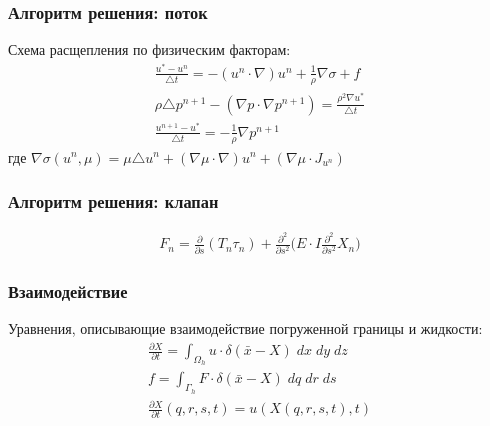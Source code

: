 \documentclass[14pt]{beamer}
\begin{document}
\begin{frame}
\frametitle{Алгоритм решения: поток}
Схема расщепления по физическим факторам:
\begin{gather}
    \label{eq:split_first}
    \frac{u^* - u^n}{\triangle t} = - (u^n \cdot \nabla) u^n + \frac{1}{\rho} \nabla \sigma + f\\
    \label{eq:split_second}
    \rho \triangle p^{n+1} - (\nabla p \cdot \nabla p^{n+1}) = \frac{\rho^2 \nabla u^*}{\triangle t}\\
    \label{eq:split_third}
    \frac{u^{n+1} - u^*}{\triangle t} = - \frac{1}{\rho} \nabla p^{n+1}
\end{gather}
где $\nabla \sigma (u^n, \mu) = \mu \triangle u^n + (\nabla \mu \cdot \nabla) u^n + (\nabla \mu \cdot J_{u^n}) $
\end{frame}

\begin{frame}
\frametitle{Алгоритм решения: клапан}
\begin{gather}
    \label{eq:strain_energy}
    F_{n} =  \frac{\partial}{\partial s}(T_{n} \tau_{n}) + \frac{\partial^2}{\partial s^2} \Big( E \cdot I \frac{\partial^2}{\partial s^2} X_{n} \Big)
\end{gather}
\end{frame}


\begin{frame}
\frametitle{Взаимодействие}
Уравнения, описывающие взаимодействие погруженной границы и жидкости:
\begin{gather}
    \label{eq:ibm_velocity}
    \frac{\partial X}{\partial t} = \int_{\Omega_h} u \cdot \delta (\bar{x} - X)\; dx\; dy\; dz \\
    \label{eq:ibm_force}
    f = \int_{\Gamma_h} F \cdot \delta (\bar{x} - X)\; dq\; dr\; ds\\
    \label{eq:no_slip}
    \frac{\partial X}{\partial t} (q, r, s, t) = u(X(q, r, s, t), t)
\end{gather}
\end{frame}
\end{document}
